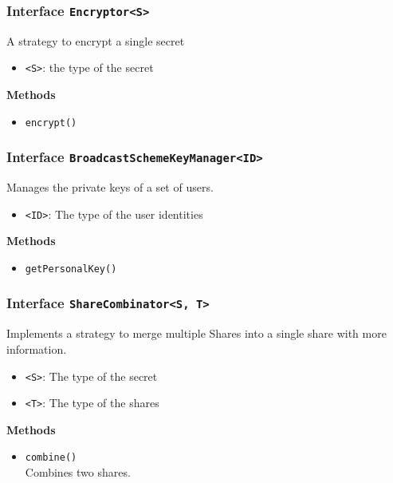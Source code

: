 \subsubsection{Interface \lstinline|Encryptor<S>|}
A strategy to encrypt a single secret
\begin{itemize}
\item \lstinline|<S>|: the type of the secret
\end{itemize}


\textbf{Methods}
\begin{itemize}
\item \lstinline|encrypt()| \\


\end{itemize}

\subsubsection{Interface \lstinline|BroadcastSchemeKeyManager<ID>|}
Manages the private keys of a set of users.
\begin{itemize}
\item \lstinline|<ID>|: The type of the user identities
\end{itemize}


\textbf{Methods}
\begin{itemize}
\item \lstinline|getPersonalKey()| \\


\end{itemize}

\subsubsection{Interface \lstinline|ShareCombinator<S, T>|}
Implements a strategy to merge multiple Shares into a single share with
 more information.
\begin{itemize}
\item \lstinline|<S>|: The type of the secret
\item \lstinline|<T>|: The type of the shares
\end{itemize}


\textbf{Methods}
\begin{itemize}
\item \lstinline|combine()| \\
Combines two shares.

\end{itemize}


